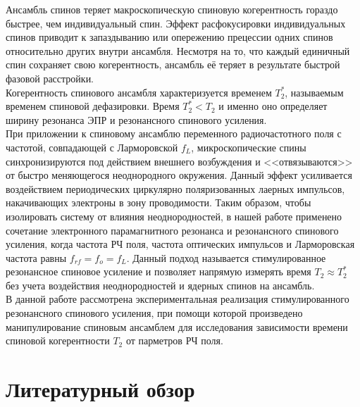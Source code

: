 \documentclass[a4paper,12pt]{article}
\begin{document}
Ансамбль спинов теряет макроскопическую спиновую когерентность гораздо быстрее, чем индивидуальный спин. Эффект расфокусировки индивидуальных спинов приводит к запаздыванию или опережению прецессии одних спинов относительно других внутри ансамбля. Несмотря на то, что каждый единичный спин сохраняет свою когерентность, ансамбль её теряет в результате быстрой фазовой расстройки. \\
Когерентность спинового ансамбля характеризуется временем $T_2^*$, называемым временем спиновой дефазировки. Время $T_2^* < T_2$ и именно оно определяет ширину резонанса ЭПР и резонансного спинового усиления\cite{kikkawa}. \\

При приложении к спиновому ансамблю переменного радиочастотного поля с частотой, совпадающей с Ларморовской $f_L$, микроскопические спины синхронизируются под действием внешнего возбуждения и <<отвязываются>> от быстро меняющегося неоднородного окружения. Данный эффект усиливается воздействием периодических циркулярно поляризованных лаерных импульсов, накачивающих электроны в зону проводимости. Таким образом, чтобы изолировать систему от влияния неоднородностей, в нашей работе применено сочетание электронного парамагнитного резонанса и резонансного спинового усиления, когда частота РЧ поля, частота оптических импульсов и Ларморовская частота равны $f_{rf} = f_o = f_L$. Данный подход называется стимулированное резонансное спиновое усиление и позволяет напрямую измерять время $T_2 \approx T_2^*$ без учета воздействия неоднородностей и ядерных спинов на ансамбль. \\

В данной работе рассмотрена экспериментальная реализация стимулированного резонансного спинового усиления, при помощи которой произведено манипулирование спиновым ансамблем для исследования зависимости времени спиновой когерентности $T_2$ от парметров РЧ поля. 

\section{Литературный обзор}
\end{document}
